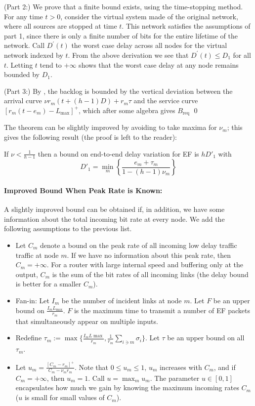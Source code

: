 (Part 2:) We prove that a finite bound exists, using the
time-stopping method. For any time $t>0$, consider the virtual
system made of the original network, where all sources are stopped
at time $t$. This network satisfies the assumptions of part 1,
since there is only a finite number of bits for the entire
lifetime of the network. Call $D^{\prime }(t)$ the worst case
delay across all nodes for the virtual network indexed by $t$.
From the above derivation we see that $D^{\prime }(t)\leq D_{1}$
for all $t$. Letting $t$ tend to $+\infty $ shows that the worst
case delay at any node remains bounded by $D_{1}$.

(Part 3:) By , the backlog is bounded by the
vertical deviation between the arrival curve $\nu r_m (t + (h-1)
D) + r_m \tau $ and the service curve $[r_m (t - e_m) -
L_{\max}]^+$, which after some algebra gives $B_{\mbox{req}}$ \qed

The theorem can be slightly improved by avoiding to take maxima
for $\nu_m$; this gives the following result (the proof is left to
the reader):
\begin{corollary}
If $\nu < \frac{1}{h-1}$ then a bound on end-to-end delay
variation for EF is $h D'_1$ with
$$
D'_1 = \min_m \left\{\frac{e_m + \tau_m}{1-(h-1) \nu_m}\right\}
$$
\end{corollary}

\paragraph{Improved Bound
When Peak Rate is Known: }

A slightly improved bound can be obtained if, in addition, we have
some information about the total incoming bit rate at every node.
We add the following assumptions to the previous list.
\begin{itemize}
\item Let $C_{m}$ denote a bound on the peak rate of all incoming
low delay traffic traffic at node $m$. If we have no information
about this peak rate, then $C_{m}=+\infty $. For a router with
large internal speed and buffering only at the output, $C_{m}$ is
the sum of the bit rates of all incoming links (the delay bound is
better for a smaller $C_{m}$).

\item Fan-in: Let $I_m$ be the number of incident links at node $m$.
Let $F$ be an upper bound on $\frac{I_m L_{\max}}{r_m}$. $F$ is
the maximum time to transmit a number of EF packets that
simultaneously appear on multiple inputs.

\item
Redefine $\tau_m:= \max\{ \frac{I_m L{\max}}{r_m},
\frac{1}{r_m}\sum_{i \ni m} \sigma_i \}$. Let $\tau$ be an upper
bound on all $\tau_m$.

\item  Let $u_{m}=\frac{[C_{m}-r_{m}]^+}{C_{m}-\nu_m r_{m}}$.
Note that $0 \leq u_{m} \leq 1$, $u_{m}$ increases with $C_{m}$,
and if $C_{m}=+\infty $, then $u_{m}=1$. Call $u=\max_{m}u_{m}$.
The parameter $u \in[0,1]$ encapsulates how much we gain by
knowing the maximum incoming rates $C_m$ ($u$ is small for small
values of $C_m$).
\end{itemize}

